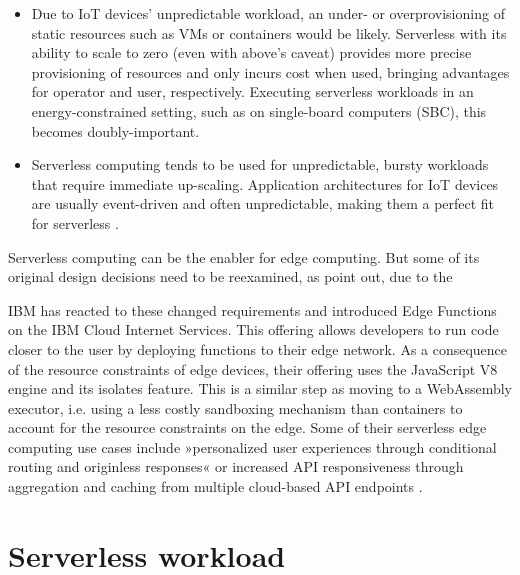 \begin{itemize}
    \item Due to IoT devices' unpredictable workload, an under- or overprovisioning of static resources such as VMs or containers would be likely. Serverless with its ability to scale to zero (even with above's caveat) provides more precise provisioning of resources and only incurs cost when used, bringing advantages for operator and user, respectively. Executing serverless workloads in an energy-constrained setting, such as on single-board computers (SBC), this becomes doubly-important.
    \item Serverless computing tends to be used for unpredictable, bursty workloads that require immediate up-scaling. Application architectures for IoT devices are usually event-driven and often unpredictable, making them a perfect fit for serverless \cite{Aslanpour2021}.
\end{itemize}

Serverless computing can be the enabler for edge computing. But some of its original design decisions need to be reexamined, as \citeauthor{Nastic2018} point out, due to the

\begin{quote}
\end{quote}

IBM has reacted to these changed requirements and introduced Edge Functions on the IBM Cloud Internet Services. This offering allows developers to run code closer to the user by deploying functions to their edge network. As a consequence of the resource constraints of edge devices, their offering uses the JavaScript V8 engine and its isolates feature. This is a similar step as moving to a WebAssembly executor, i.e. using a less costly sandboxing mechanism than containers to account for the resource constraints on the edge. Some of their serverless edge computing use cases include »personalized user experiences through conditional routing and originless responses« or increased API responsiveness through aggregation and caching from multiple cloud-based API endpoints \cite{Farid2019}.

\section{Serverless workload}
\label{section:serverless_workload}

